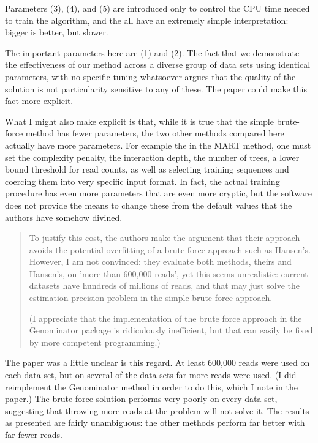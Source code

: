 \documentclass{article}
\begin{document}
Parameters (3), (4), and (5) are introduced only to control the CPU time needed
to train the algorithm, and the all have an extremely simple interpretation:
bigger is better, but slower.

The important parameters here are (1) and (2).  The fact that we demonstrate the
effectiveness of our method across a diverse group of data sets using identical
parameters, with no specific tuning whatsoever argues that the quality of the
solution is not particularity sensitive to any of these. The paper could make
this fact more explicit.

What I might also make explicit is that, while it is true that the simple
brute-force method has fewer parameters, the two other methods compared here
actually have more parameters. For example the in the MART method, one must set
the complexity penalty, the interaction depth, the number of trees, a lower
bound threshold for read counts, as well as selecting training sequences and
coercing them into very specific input format. In fact, the actual training
procedure has even more parameters that are even more cryptic, but the software
does not provide the means to change these from the default values that the
authors have somehow divined.



\begin{quote}
To justify this cost, the
authors make the argument that their approach avoids the potential
overfitting of a brute force approach such as Hansen's. However, I am
not convinced: they evaluate both methods, theirs and Hansen's, on
'more than 600,000 reads', yet this seems unrealistic: current
datasets have hundreds of millions of reads, and that may just solve
the estimation precision problem in the simple brute force approach.

(I appreciate that the implementation of the brute force approach in
the Genominator package is ridiculously inefficient, but that can
easily be fixed by more competent programming.)
\end{quote}

The paper was a little unclear is this regard. At least 600,000 reads were used
on each data set, but on several of the data sets far more reads were used.  (I
did reimplement the Genominator method in order to do this, which I note in the
paper.) The brute-force solution performs very poorly on every data set,
suggesting that throwing more reads at the problem will not solve it.  The
results as presented are fairly unambiguous: the other methods perform far
better with far fewer reads.
\end{document}
